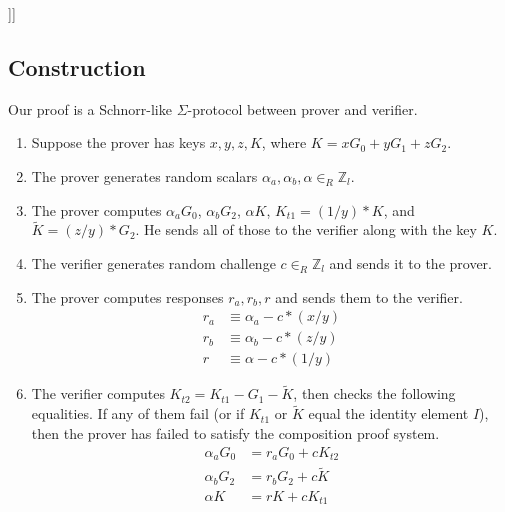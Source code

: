 \begin{appendices}
[[[explain how it satisfies the requirements?]]]


\subsection{Construction}
\label{appendix:composition-proof-construction}

Our proof is a Schnorr-like $\Sigma$-protocol between prover and verifier.

\begin{enumerate}
    \item Suppose the prover has keys $x, y, z, K$, where $K = x G_0 + y G_1 + z G_2$.

    \item The prover generates random scalars $\alpha_a, \alpha_b, \alpha \in_R \mathbb{Z}_l$.

    \item The prover computes $\alpha_a G_0$, $\alpha_b G_2$, $\alpha K$, $K_{t1} = (1/y)*K$, and $\tilde{K} = (z/y)*G_2$. He sends all of those to the verifier along with the key $K$.

    \item The verifier generates random challenge $c \in_R \mathbb{Z}_l$ and sends it to the prover.

    \item The prover computes responses $r_a, r_b, r$ and sends them to the verifier.\vspace{.115cm}
    \begin{align*}
        r_a &\equiv \alpha_a - c*(x/y) \\
        r_b &\equiv \alpha_b - c*(z/y) \\
        r   &\equiv \alpha   - c*(1/y)
    \end{align*}

    \item The verifier computes $K_{t2} = K_{t1} - G_1 - \tilde{K}$, then checks the following equalities. If any of them fail (or if $K_{t1}$ or $\tilde{K}$ equal the identity element $I$), then the prover has failed to satisfy the composition proof system.\vspace{.115cm}
    \begin{align*}
        \alpha_a G_0 &= r_a G_0 + c K_{t2} \\
        \alpha_b G_2 &= r_b G_2 + c \tilde{K} \\
        \alpha   K   &= r K     + c K_{t1}
    \end{align*}
\end{enumerate}




\end{appendices}
